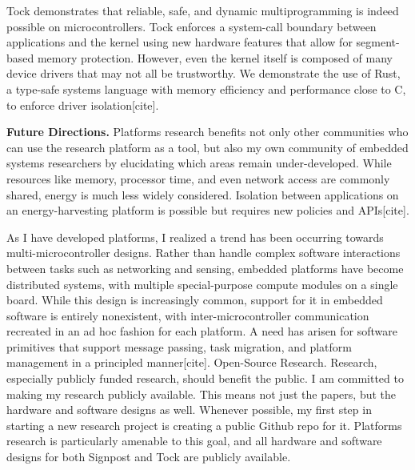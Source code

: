 \documentclass[12pt]{article} %
\begin{document}
Tock demonstrates that reliable, safe, and dynamic multiprogramming is indeed
possible on microcontrollers. Tock enforces a system-call boundary between
applications and the kernel using new hardware features that allow for
segment-based memory protection. However, even the kernel itself is composed of
many device drivers that may not all be trustworthy. We demonstrate the use of
Rust, a type-safe systems language with memory efficiency and performance close
to C, to enforce driver isolation[cite].

\textbf{Future Directions.} Platforms research benefits not only other communities who
can use the research platform as a tool, but also my own community of embedded
systems researchers by elucidating which areas remain under-developed. While
resources like memory, processor time, and even network access are commonly
shared, energy is much less widely considered. Isolation between applications
on an energy-harvesting platform is possible but requires new policies and
APIs[cite].

As I have developed platforms, I realized a trend has been occurring towards
multi-microcontroller designs. Rather than handle complex software interactions
between tasks such as networking and sensing, embedded platforms have become
distributed systems, with multiple special-purpose compute modules on a single
board. While this design is increasingly common, support for it in embedded
software is entirely nonexistent, with inter-microcontroller communication
recreated in an ad hoc fashion for each platform. A need has arisen for
software primitives that support message passing, task migration, and platform
management in a principled manner[cite]. Open-Source Research. Research,
especially publicly funded research, should benefit the public. I am committed
to making my research publicly available. This means not just the papers, but
the hardware and software designs as well. Whenever possible, my first step in
starting a new research project is creating a public Github repo for it.
Platforms research is particularly amenable to this goal, and all hardware and
software designs for both Signpost and Tock are publicly available.
\end{document}
